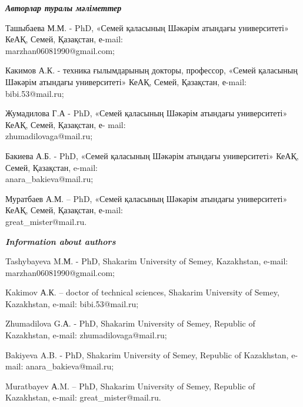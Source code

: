 \begin{authorinfo}
\emph{{\bfseries Авторлар туралы мәліметтер}}

Ташыбаева М.М. - PhD, «Семей қаласының Шәкәрім атындағы университеті»
КеАҚ, Семей, Қазақстан, е-mail: \\marzhan06081990@gmail.com;

Какимов А.К. - техника ғылымдарының докторы, профессор, «Семей қаласының
Шәкәрім атындағы университеті» КеАҚ, Семей, Қазақстан, е-mail:
bibi.53@mail.ru;

Жумадилова Г.А - PhD, «Семей қаласының Шәкәрім атындағы университеті»
КеАҚ, Семей, Қазақстан, е- mail: \\zhumadilovaga@mail.ru;

Бакиева А.Б. - PhD, «Семей қаласының Шәкәрім атындағы университеті»
КеАҚ, Семей, Қазақстан, e-mail: \\anara\_bakieva@mail.ru;

Муратбаев А.М. -- PhD, «Семей қаласының Шәкәрім атындағы университеті»
КеАҚ, Семей, Қазақстан, е-mail: \\great\_mister@mail.ru.

\emph{{\bfseries Information about authors}}

Tashybayeva M.М. - PhD, Shakarim University of Semey, Kazakhstan,
e-mail: marzhan06081990@gmail.com;

Kakimov А.К. -- doctor of technical sciences, Shakarim University of
Semey, Kazakhstan, e-mail: bibi.53@mail.ru;

Zhumadilova G.А. - PhD, Shakarim University of Semey, Republic of
Kazakhstan, e-mail: zhumadilovaga@mail.ru;

Bakiyeva A.B. - PhD, Shakarim University of Semey, Republic of
Kazakhstan, e-mail: anara\_bakieva@mail.ru;

Muratbayev А.M. -- PhD, Shakarim University of Semey, Republic of
Kazakhstan, e-mail: great\_mister@mail.ru.
\end{authorinfo}
